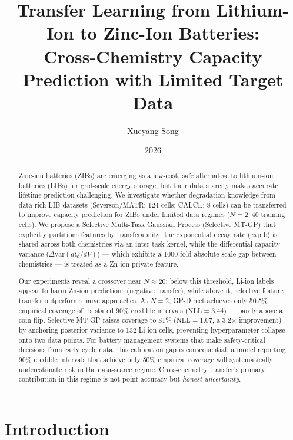 \documentclass[12pt]{article}
\title{\textbf{Transfer Learning from Lithium-Ion to Zinc-Ion Batteries:\\
Cross-Chemistry Capacity Prediction with Limited Target Data}}
\author{Xueyang Song}
\date{2026}
\begin{document}
\maketitle

\begin{abstract}
Zinc-ion batteries (ZIBs) are emerging as a low-cost, safe alternative to
lithium-ion batteries (LIBs) for grid-scale energy storage, but their data
scarcity makes accurate lifetime prediction challenging. We investigate whether
degradation knowledge from data-rich LIB datasets (Severson/MATR: 124 cells;
CALCE: 8 cells) can be transferred to improve capacity prediction for ZIBs under
limited data regimes ($N = 2$--$40$ training cells). We propose a Selective
Multi-Task Gaussian Process (Selective MT-GP) that explicitly partitions features
by transferability: the exponential decay rate ($\text{exp\_b}$) is shared across
both chemistries via an inter-task kernel, while the differential capacity
variance ($\Delta\mathrm{var}(dQ/dV)$) --- which exhibits a 1000-fold absolute
scale gap between chemistries --- is treated as a Zn-ion-private feature.

Our experiments reveal a crossover near $N \approx 20$: below this
threshold, Li-ion labels appear to harm Zn-ion predictions (negative transfer),
while above it, selective feature transfer outperforms na\"ive approaches.
At $N = 2$, GP-Direct achieves only 50.5\% empirical coverage of its stated
90\% credible intervals ($\mathrm{NLL} = 3.44$) --- barely above a coin flip.
Selective MT-GP raises coverage to 81\% ($\mathrm{NLL} = 1.07$, a
3.2$\times$ improvement) by anchoring posterior variance to 132 Li-ion cells,
preventing hyperparameter collapse onto two data points.
For battery management systems that make safety-critical decisions from early
cycle data, this calibration gap is consequential: a model reporting 90\%
credible intervals that achieve only 50\% empirical coverage will systematically
underestimate risk in the data-scarce regime. Cross-chemistry transfer's primary
contribution in this regime is not point accuracy but \emph{honest uncertainty}.
\end{abstract}

\section{Introduction}
\label{sec:intro}
\end{document}

